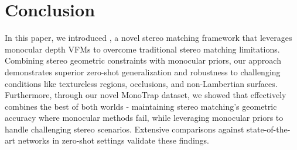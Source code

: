 \section{Conclusion}
\label{sec:conclusion}

In this paper, we introduced \method, a novel stereo matching framework that leverages monocular depth VFMs to overcome traditional stereo matching limitations. Combining stereo geometric constraints with monocular priors, our approach demonstrates superior zero-shot generalization and robustness to challenging conditions like textureless regions, occlusions, and non-Lambertian surfaces. Furthermore, through our novel MonoTrap dataset, we showed that \method effectively combines the best of both worlds - maintaining stereo matching's geometric accuracy where monocular methods fail, while leveraging monocular priors to handle challenging stereo scenarios. Extensive comparisons against state-of-the-art networks in zero-shot settings validate these findings.